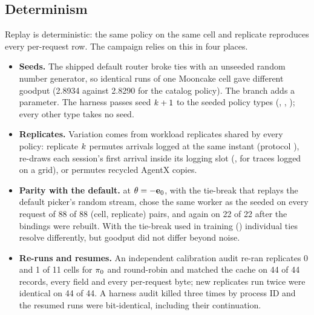 \subsection{Determinism}
\label{app:determinism}

Replay is deterministic: the same policy on the same cell and replicate reproduces every
per-request row. The campaign relies on this in four places.
\begin{itemize}
  \item \textbf{Seeds.} The shipped default router broke ties with an unseeded random number
    generator, so identical runs of one Mooncake cell gave different goodput (2.8934 against 2.8290
    for the catalog policy). The branch adds a  parameter. The harness passes seed
    $k + 1$ to the seeded policy types (, \lc{}, ); every
    other type takes no seed.
  \item \textbf{Replicates.} Variation comes from workload replicates shared by every policy:
    replicate $k$ permutes arrivals logged at the same instant (protocol ),
    re-draws each session's first arrival inside its logging slot (, for traces
    logged on a grid), or permutes recycled AgentX copies.
  \item \textbf{Parity with the default.} \lc{} at $\theta = -\mathbf{e}_{0}$, with the tie-break that
    replays the default picker's random stream, chose the same worker as the seeded  on
    every request of 88 of 88 (cell, replicate) pairs, and again on 22 of 22 after the bindings were
    rebuilt. With the tie-break used in training () individual ties resolve
    differently, but goodput did not differ beyond noise.
  \item \textbf{Re-runs and resumes.} An independent calibration audit re-ran replicates 0 and 1 of
    11 cells for $\pi_{0}$ and round-robin and matched the cache on 44 of 44 records, every field and
    every per-request byte; new replicates run twice were identical on 44 of 44. A harness audit
    killed  three times by process ID and the resumed runs were bit-identical,
    including their continuation.
\end{itemize}
